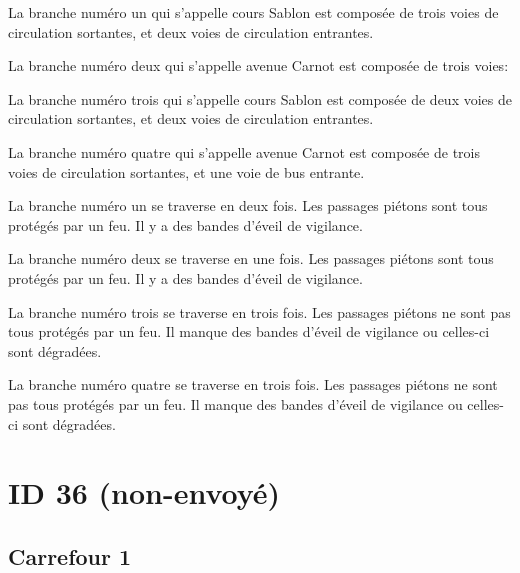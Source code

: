 \begin{appendix}
\newpar{}

La branche numéro un qui s'appelle cours Sablon est composée de trois voies de circulation sortantes, et deux voies de circulation entrantes.

\newpar{}

La branche numéro deux qui s'appelle avenue Carnot est composée  de trois voies: 

\newpar{}

La branche numéro trois qui s'appelle cours Sablon est composée de deux voies de circulation sortantes, et deux voies de circulation entrantes. 

\newpar{}

La branche numéro quatre qui s'appelle avenue Carnot est composée de trois voies de circulation sortantes, et une voie de bus entrante. 

\newpar{}

La branche numéro un se traverse en deux fois. Les passages piétons sont tous protégés par un feu. Il y a des bandes d'éveil de vigilance.

\newpar{}

La branche numéro deux se traverse en une fois. Les passages piétons sont tous protégés par un feu. Il y a des bandes d'éveil de vigilance.

\newpar{}

La branche numéro trois se traverse en trois fois. Les passages piétons ne sont pas tous protégés par un feu. Il manque des bandes d'éveil de vigilance ou celles-ci sont dégradées.

\newpar{}

La branche numéro quatre se traverse en trois fois. Les passages piétons ne sont pas tous protégés par un feu. Il manque des bandes d'éveil de vigilance ou celles-ci sont dégradées.

\section*{ID 36 (non-envoyé)}

\label{annexe:q_ID36}

\subsection*{Carrefour 1}


\end{appendix}
